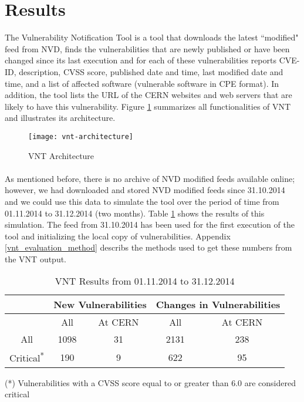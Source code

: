 \section{Results}
The Vulnerability Notification Tool is a tool that downloads the latest ``modified" feed from NVD, finds the vulnerabilities that are newly published or have been changed since its last execution and for each of these vulnerabilities reports CVE-ID, description, CVSS score, published date and time, last modified date and time, and a list of affected software (vulnerable software in CPE format). In addition, the tool lists the URL of the CERN websites and web servers that are likely to have this vulnerability. Figure \ref{figure:vnt_arch} summarizes all functionalities of VNT and illustrates its architecture.

\begin{figure}[h!]
  \centering
    \texttt{[image: vnt-architecture]}
  \caption{VNT Architecture}
   \label{figure:vnt_arch}
\end{figure}




\paragraph{}
As mentioned before, there is no archive of NVD modified feeds available online; however, we had downloaded and stored NVD modified feeds since 31.10.2014 and we could use this data to simulate the tool over the period of time from 01.11.2014 to 31.12.2014 (two months). Table \ref{table:vnt_results} shows the results of this simulation. The feed from 31.10.2014 has been used for the first execution of the tool and initializing the local copy of vulnerabilities. Appendix \ref{vnt_evaluation_method} describs the methods used to get these numbers from the VNT output.

\begin{table}
\begin{center}
    \begin{tabular}{ | c || c | c || c | c |}
    
    \hline
	 
     &  \multicolumn{2}{c||}{New Vulnerabilities} &  \multicolumn{2}{c|}{Changes in Vulnerabilities}  
	\\ \hline   
      &  All &  At CERN &  All &  At CERN
    \\ 
	\hline    
       All & \multicolumn{1}{|c|}{\cellcolor{red!25}1098}   &  31 & \multicolumn{1}{|c|}{\cellcolor{red!25}2131}  & 238 
   \\ \hhline{|*5-}
\hhline{~~|-|~|-|}
Critical\textsuperscript{*} & 190  & \multicolumn{1}{|c||}{\cellcolor{green!25}9}  & 622  & \multicolumn{1}{|c|}{\cellcolor{green!25}95  }
    \\ \hline
    \end{tabular}
    \caption{VNT Results from 01.11.2014 to 31.12.2014}
    \label{table:vnt_results}
   \end{center}
   \footnotesize{(*) Vulnerabilities with a CVSS score equal to or greater than 6.0 are considered critical}
    \end{table}


